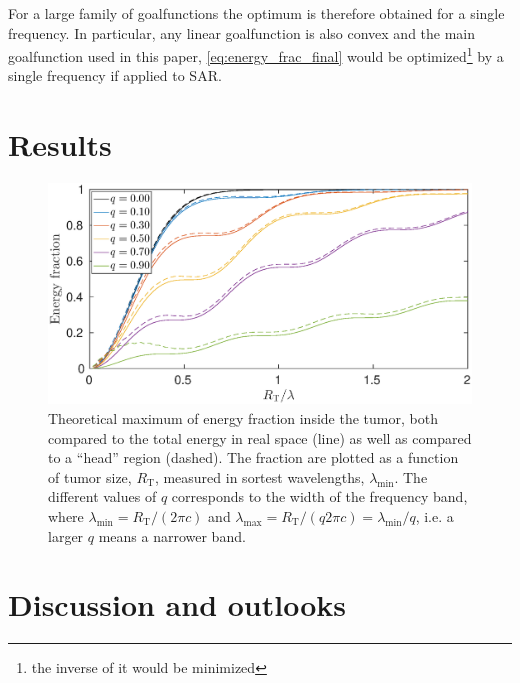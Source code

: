 \documentclass[11pt,a4paper, 
swedish,english %
]{article}
\newcommand{\RT}{\ensuremath{R_{\text{T}}}}
\begin{document}
For a large family of goalfunctions the optimum is therefore obtained
for a single frequency. In particular, any linear goalfunction is also
convex and the main goalfunction used in this paper,
\eqref{eq:energy_frac_final} would be optimized\footnote{the inverse
  of it would be minimized} by a single frequency if applied to SAR.  


\section{Results}

\begin{figure}\centering
\centerline{ %
\includegraphics[width=18cm]{ring_both_L1000.eps}
}
\caption{Theoretical maximum of energy fraction inside the tumor, both
  compared to the total energy in real space (line) as well as
  compared to a ``head'' region (dashed). The fraction are plotted as
  a function of tumor size, $\RT$, measured in sortest wavelengths,
  $\lambda_{\min}$. The different values of $q$ corresponds to the width of
  the frequency band, where $\lambda_{\min}=\RT/(2\pi c)$ and
  $\lambda_{\max}=\RT/(q2\pi c)=\lambda_{\min}/q$, i.e. a larger $q$
  means a narrower band. }
\label{fig:both}
\end{figure}


\section{Discussion and outlooks}
\label{sec:discussion}


\end{document}
